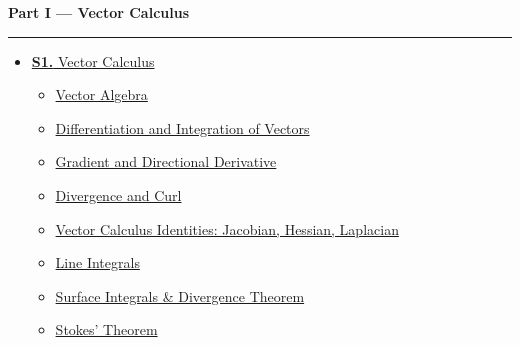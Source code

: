 \documentclass[12pt]{article}
\begin{document}
\begin{tcolorbox}[breakable,colback=cA!5,colframe=cA,boxrule=1pt,arc=5pt,
  left=8pt,right=8pt,top=8pt,bottom=8pt,before skip=4pt]
  {\large\bfseries\textcolor{cA}{Part I --- Vector Calculus}}\par\vspace{5pt}
  \textcolor{cA!40}{\rule{\linewidth}{0.4pt}}\par\vspace{3pt}
  \small\begin{itemize}[leftmargin=1.2em,itemsep=1pt,label={\textcolor{cA}{$\triangleright$}}]
    \item \hyperref[sec:S4]{\textbf{S1.} Vector Calculus}
      \begin{itemize}[leftmargin=1.5em,itemsep=0pt,label={\textcolor{cA}{$\cdot$}}]
        \item \hyperref[sub:s4-algebra]{Vector Algebra}
        \item \hyperref[sub:s4-diffint]{Differentiation and Integration of Vectors}
        \item \hyperref[sub:s4-gradient]{Gradient and Directional Derivative}
        \item \hyperref[sub:s4-divcurl]{Divergence and Curl}
        \item \hyperref[sub:s4-identities]{Vector Calculus Identities: Jacobian, Hessian, Laplacian}
        \item \hyperref[sub:s4-lineint]{Line Integrals}
        \item \hyperref[sub:s4-surface]{Surface Integrals \& Divergence Theorem}
        \item \hyperref[sub:s4-stokes]{Stokes' Theorem}
      \end{itemize}
  \end{itemize}
\end{tcolorbox}

\vspace{6pt}
\end{document}
